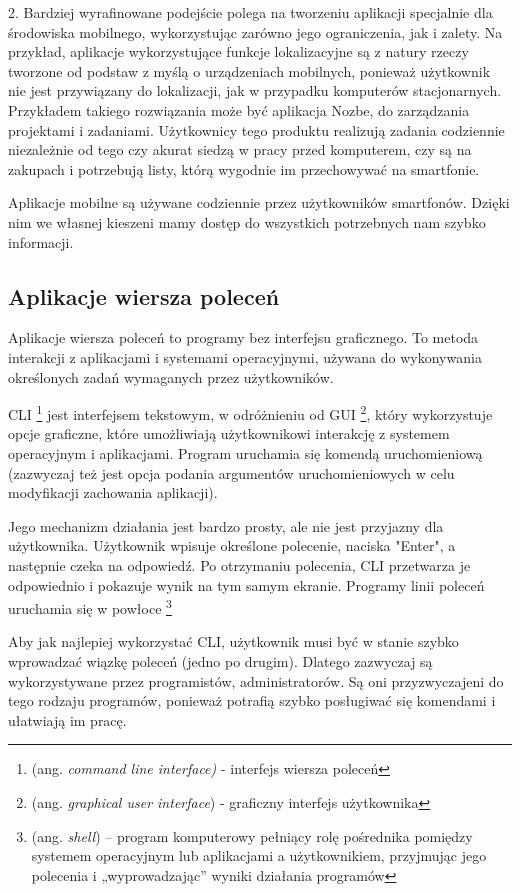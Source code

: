 2. Bardziej wyrafinowane podejście polega na tworzeniu aplikacji specjalnie dla środowiska mobilnego, wykorzystując zarówno jego ograniczenia, jak i zalety. Na przykład, aplikacje wykorzystujące funkcje lokalizacyjne są z natury rzeczy tworzone od podstaw z myślą o urządzeniach mobilnych, ponieważ użytkownik nie jest przywiązany do lokalizacji, jak w przypadku komputerów stacjonarnych. Przykładem takiego rozwiązania może być aplikacja Nozbe, do zarządzania projektami i zadaniami. Użytkownicy tego produktu realizują zadania codziennie niezależnie od tego czy akurat siedzą w pracy przed komputerem, czy są na zakupach i potrzebują listy, którą wygodnie im przechowywać na smartfonie.

Aplikacje mobilne są używane codziennie przez użytkowników smartfonów. Dzięki nim we własnej kieszeni mamy dostęp do wszystkich potrzebnych nam szybko informacji.
\subsection{Aplikacje wiersza poleceń}
Aplikacje wiersza poleceń to programy bez interfejsu graficznego. To metoda interakcji z aplikacjami i systemami operacyjnymi, używana do wykonywania określonych zadań wymaganych przez użytkowników. 

CLI \footnote{(ang. \textit{command line interface)} - interfejs wiersza poleceń} jest interfejsem tekstowym, w odróżnieniu od GUI \footnote{(ang. \textit{graphical user interface}) - graficzny interfejs użytkownika}, który wykorzystuje opcje graficzne, które umożliwiają użytkownikowi interakcję z systemem operacyjnym i aplikacjami. Program uruchamia się komendą uruchomieniową (zazwyczaj też jest opcja podania argumentów uruchomieniowych w celu modyfikacji zachowania aplikacji).

Jego mechanizm działania jest bardzo prosty, ale nie jest przyjazny dla użytkownika. Użytkownik wpisuje określone polecenie, naciska "Enter", a następnie czeka na odpowiedź. Po otrzymaniu polecenia, CLI przetwarza je odpowiednio i pokazuje wynik na tym samym ekranie. Programy linii poleceń uruchamia się w powłoce \footnote{(ang. \textit{shell}) – program komputerowy pełniący rolę pośrednika pomiędzy systemem operacyjnym lub aplikacjami a użytkownikiem, przyjmując jego polecenia i „wyprowadzając” wyniki działania programów}

Aby jak najlepiej wykorzystać CLI, użytkownik musi być w stanie szybko wprowadzać wiązkę poleceń (jedno po drugim). Dlatego zazwyczaj są wykorzystywane przez programistów, administratorów. Są oni przyzwyczajeni do tego rodzaju programów, ponieważ potrafią szybko posługiwać się komendami i ułatwiają im pracę.

